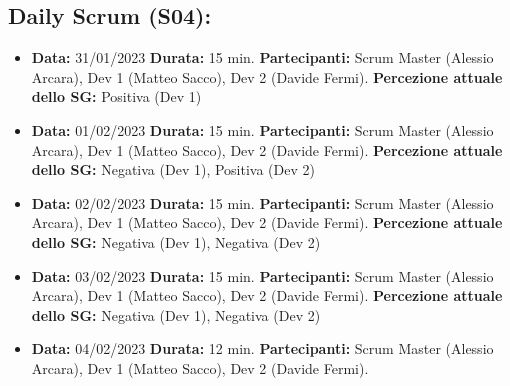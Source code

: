 \documentclass[a4paper, oneside]{article}
\newcommand\quattro{Scrum Master (Alessio Arcara), Dev 1 (Matteo Sacco), Dev 2 (Davide Fermi).}
\begin{document}
\begin{landscape}
        \subsection{Daily Scrum (S04):}
        \begin{itemize}
            \item \textbf{Data:} 31/01/2023
            \newline \textbf{Durata:} 15 min.
            \newline \textbf{Partecipanti:} \quattro
            \newline \textbf{Percezione attuale dello SG:} Positiva (Dev 1)
        \end{itemize}
        \begin{itemize}
            \item \textbf{Data:} 01/02/2023
            \newline \textbf{Durata:} 15 min.
            \newline \textbf{Partecipanti:} \quattro
            \newline \textbf{Percezione attuale dello SG:} Negativa (Dev 1), Positiva (Dev 2)
        \end{itemize}
        \begin{itemize}
            \item \textbf{Data:} 02/02/2023
            \newline \textbf{Durata:} 15 min.
            \newline \textbf{Partecipanti:} \quattro
            \newline \textbf{Percezione attuale dello SG:} Negativa (Dev 1), Negativa (Dev 2)
        \end{itemize}
        \begin{itemize}
            \item \textbf{Data:} 03/02/2023
            \newline \textbf{Durata:} 15 min.
            \newline \textbf{Partecipanti:} \quattro
            \newline \textbf{Percezione attuale dello SG:} Negativa (Dev 1), Negativa (Dev 2)
        \end{itemize}
        \begin{itemize}
            \item \textbf{Data:} 04/02/2023
            \newline \textbf{Durata:} 12 min.
            \newline \textbf{Partecipanti:}  \quattro

\end{itemize}
\end{landscape}
\end{document}
